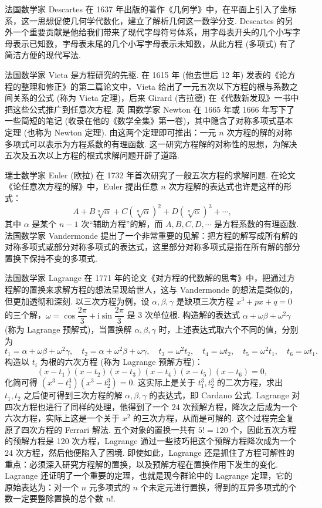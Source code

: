 \documentclass[UTF8, 12pt, fontset=fandol, oneside]{ctexart}
\begin{document}
法国数学家 Descartes 在 1637 年出版的著作《几何学》中，在平面上引入了坐标系，这一思想促使几何学代数化，建立了解析几何这一数学分支. Descartes 的另外一个重要贡献是他给我们带来了现代字母符号体系，用字母表开头的几个小写字母表示已知数，字母表末尾的几个小写字母表示未知数，从此方程 (多项式) 有了简洁方便的现代写法.

法国数学家 Vieta 是方程研究的先驱. 在 1615 年 (他去世后 12 年) 发表的《论方程的整理和修正》的第二篇论文中，Vieta 给出了一元五次以下方程的根与系数之间关系的公式 (称为 Vieta 定理)，后来 Girard (吉拉德) 在《代数新发现》一书中把这些公式推广到任意次方程. 英
国数学家 Newton 在 1665 年或 1666 年写下了一些简短的笔记 (收录在他的《数学全集》第一卷)，其中隐含了对称多项式基本定理 (也称为 Newton 定理). 由这两个定理即可推出：一元 $n$ 次方程的解的对称多项式可以表示为方程系数的有理函数. 这一研究方程解的对称性的思想，为解决五次及五次以上方程的根式求解问题开辟了道路.

瑞士数学家 Euler (欧拉) 在 1732 年首次研究了一般五次方程的求解问题. 在论文《论任意次方程的解》中，Euler 提出任意 $n$ 次方程解的表达式也许是这样的形式：
\[
A+B\sqrt[n]{\alpha}+C(\sqrt[n]{\alpha})^2+D(\sqrt[n]{\alpha})^3+\cdots,
\]
其中 $\alpha$ 是某个 $n-1$ 次“辅助方程”的解，而 $A,B,C,D,\cdots$ 是方程系数的有理函数. 法国数学家 Vandermonde 提出了一个非常重要的见解：把方程的解写成所有解的对称多项式或部分对称多项式的表达式，这里部分对称多项式是指在所有解的部分置换下保持不变的多项式.

法国数学家 Lagrange 在 1771 年的论文《对方程的代数解的思考》中，把通过方程解的置换来求解方程的想法呈现给世人，这与 Vandermonde 的想法是类似的，但更加透彻和深刻. 以三次方程为例，设 $\alpha,\beta,\gamma$ 是缺项三次方程 $x^3+px+q=0$ 的三个解，$\omega=\cos\dfrac{2\pi}{3}+\mathrm{i}\sin\dfrac{2\pi}{3}$ 是 3 次单位根. 构造解的表达式 $\alpha+\omega\beta+\omega^2\gamma$ (称为 Lagrange 预解式)，当置换解 $\alpha,\beta,\gamma$ 时，上述表达式取六个不同的值，分别为
\[
t_1=\alpha+\omega\beta+\omega^2\gamma,\quad
t_2=\alpha+\omega^2\beta+\omega\gamma,\quad
t_3=\omega^2t_2,\quad
t_4=\omega t_2,\quad
t_5=\omega^2t_1,\quad
t_6=\omega t_1.
\]
构造以 $t_i$ 为根的六次方程 (称为 Lagrange 预解方程)：
\[
(x-t_1)(x-t_2)(x-t_3)(x-t_4)(x-t_5)(x-t_6)=0,
\]
化简可得 $(x^3-t_1^3)(x^3-t_2^3)=0$. 这实际上是关于 $t_1^3,t_2^3$ 的二次方程，求出 $t_1,t_2$ 之后便可得到三次方程的解 $\alpha,\beta,\gamma$ 的表达式，即 Cardano 公式. Lagrange 对四次方程也进行了同样的处理，他得到了一个 24 次预解方程，降次之后成为一个六次方程，实际上这是一个关于 $x^2$ 的三次方程，从而是可解的. 这个过程完全复原了四次方程的 Ferrari 解法. 五个对象的置换一共有 $5!=120$ 个，因此五次方程的预解方程是 120 次方程，Lagrange 通过一些技巧把这个预解方程降次成为一个 24 次方程，然后他便陷入了困境. 即使如此，Lagrange 还是抓住了方程可解性的重点：必须深入研究方程解的置换，以及预解方程在置换作用下发生的变化. Lagrange 还证明了一个重要的定理，也就是现今群论中的 Lagrange 定理，它的原始表达为：对一个 $n$ 元多项式的 $n$ 个未定元进行置换，得到的互异多项式的个数一定要整除置换的总个数 $n!$.
\end{document}
